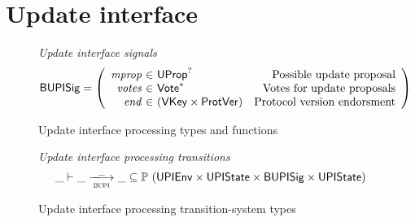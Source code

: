 \documentclass[11pt,a4paper]{article}
\newcommand{\powerset}[1]{\mathbb{P}~#1}
\newcommand{\var}[1]{\mathit{#1}}
\newcommand{\fun}[1]{\mathsf{#1}}
\newcommand{\type}[1]{\mathsf{#1}}
\newcommand{\trans}[2]{\xlongrightarrow[\textsc{#1}]{#2}}
\newcommand{\seqof}[1]{#1^{*}}
\newcommand{\VKey}{\type{VKey}}
\begin{document}
\section{Update interface}

\newcommand{\bupdprop}[1]{\fun{bUpdProp}\ #1}
\newcommand{\bupdvotes}[1]{\fun{bUpdVotes}\ #1}
\newcommand{\bprotver}[1]{\fun{bProtVer}\ #1}
\newcommand{\bendorsment}[1]{\fun{bEndorsment}\ #1}

\newcommand{\Bupisig}{\type{BUPISig}}

\newcommand{\UPIEnv}{\type{UPIEnv}}
\newcommand{\UPIState}{\type{UPIState}}
\newcommand{\UProp}{\type{UProp}}
\newcommand{\Vote}{\ensuremath{\type{Vote}}}
\newcommand{\ProtVer}{\ensuremath{\type{ProtVer}}}

\begin{figure}[ht]
  \emph{Update interface signals}
  \begin{equation*}
    \Bupisig =
    \left(
      \begin{array}{r@{~\in~}lr}
        \var{mprop} & \UProp^{?} & \text{Possible update proposal}\\
        \var{votes} & \seqof{\Vote} & \text{Votes for update proposals}\\
        \var{end} & (\VKey \times \ProtVer) & \text{Protocol version endorsment}
      \end{array}
    \right)
  \end{equation*}

  \caption{Update interface processing types and functions}
  \label{fig:defs:bupi}
\end{figure}

\begin{figure}[ht]
  \emph{Update interface processing transitions}
  \begin{equation*}
    \_ \vdash \var{\_} \trans{bupi}{\_} \var{\_} \subseteq
    \powerset (\UPIEnv \times \UPIState \times \Bupisig \times \UPIState)
  \end{equation*}
  \caption{Update interface processing transition-system types}
  \label{fig:ts-types:bupi}
\end{figure}
\end{document}
